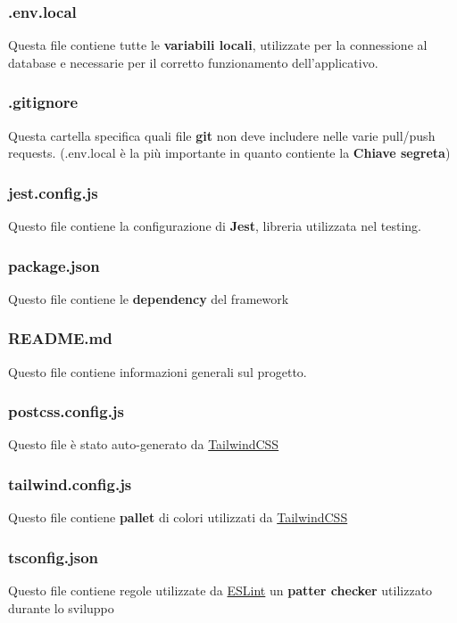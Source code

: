\documentclass[11pt, a4paper]{article}
\theoremstyle{definition}
\begin{document}
\subsubsection{.env.local}
Questa file contiene tutte le \textbf{variabili locali}, utilizzate per la connessione al database e necessarie per il corretto funzionamento dell'applicativo.
\subsubsection{.gitignore}
Questa cartella specifica quali file \textbf{git} non deve includere nelle varie pull/push requests. (.env.local è la più importante in quanto contiente la \textbf{Chiave segreta})
\subsubsection{jest.config.js}
Questo file contiene la configurazione di \textbf{Jest}, libreria utilizzata nel testing.
\subsubsection{package.json}
Questo file contiene le \textbf{dependency} del framework
\subsubsection{README.md}
Questo file contiene informazioni generali sul progetto.
\subsubsection{postcss.config.js}
Questo file è stato auto-generato da \href{https://tailwindcss.com/}{TailwindCSS}
\subsubsection{tailwind.config.js}
Questo file contiene \textbf{pallet} di colori utilizzati da \href{https://tailwindcss.com/}{TailwindCSS}
\subsubsection{tsconfig.json}
Questo file contiene regole utilizzate da \href{https://eslint.org/}{ESLint} un \textbf{patter checker} utilizzato durante lo sviluppo
  
\end{document}
